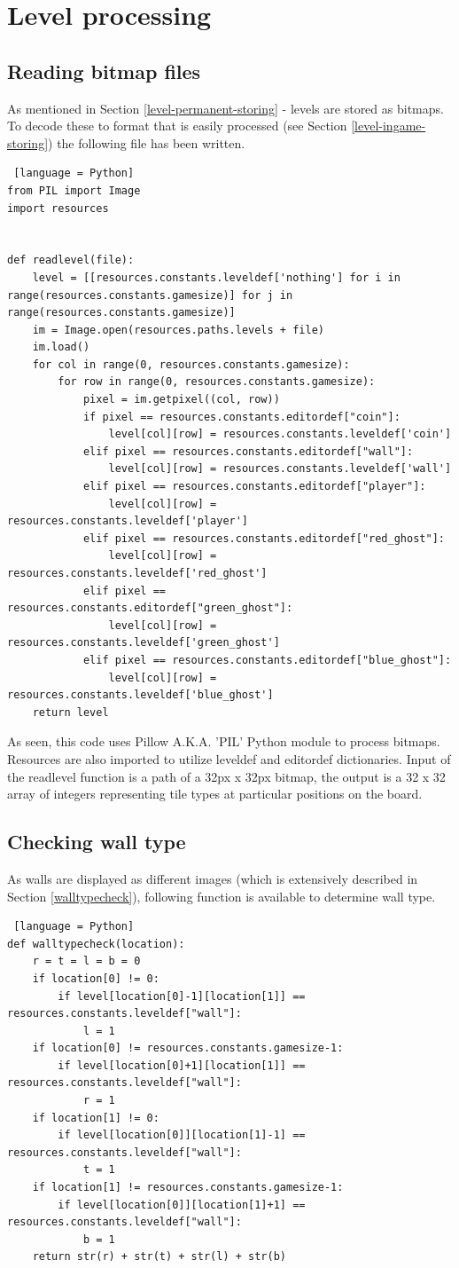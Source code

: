\documentclass[11pt,a4paper,notitlepage]{report}
\newcommand{\dsubsection}[1]{\FloatBarrier \subsection{#1}}
\begin{document}
		\section{Level processing}
			\dsubsection{Reading bitmap files}
				As mentioned in Section \ref{level-permanent-storing} - levels are stored as bitmaps. To decode these to format that is easily processed (see Section \ref{level-ingame-storing}) the following file has been written.
				\begin{lstlisting} [language = Python]
from PIL import Image
import resources


def readlevel(file):
	level = [[resources.constants.leveldef['nothing'] for i in range(resources.constants.gamesize)] for j in range(resources.constants.gamesize)]
	im = Image.open(resources.paths.levels + file)
	im.load()
	for col in range(0, resources.constants.gamesize):
		for row in range(0, resources.constants.gamesize):
			pixel = im.getpixel((col, row))
			if pixel == resources.constants.editordef["coin"]:
				level[col][row] = resources.constants.leveldef['coin']
			elif pixel == resources.constants.editordef["wall"]:
				level[col][row] = resources.constants.leveldef['wall']
			elif pixel == resources.constants.editordef["player"]:
				level[col][row] = resources.constants.leveldef['player']
			elif pixel == resources.constants.editordef["red_ghost"]:
				level[col][row] = resources.constants.leveldef['red_ghost']
			elif pixel == resources.constants.editordef["green_ghost"]:
				level[col][row] = resources.constants.leveldef['green_ghost']
			elif pixel == resources.constants.editordef["blue_ghost"]:
				level[col][row] = resources.constants.leveldef['blue_ghost']
	return level
				\end{lstlisting}
				As seen, this code uses Pillow A.K.A. 'PIL' Python module to process bitmaps. Resources are also imported to utilize leveldef and editordef dictionaries. Input of the readlevel function is a path of a 32px x 32px bitmap, the output is a 32 x 32 array of integers representing tile types at particular positions on the board. 
			\dsubsection{Checking wall type}
				As walls are displayed as different images (which is extensively described in Section \ref{walltypecheck}), following function is available to determine wall type.
				\begin{lstlisting} [language = Python]
def walltypecheck(location):
	r = t = l = b = 0
	if location[0] != 0:
		if level[location[0]-1][location[1]] == resources.constants.leveldef["wall"]:
			l = 1
	if location[0] != resources.constants.gamesize-1:
		if level[location[0]+1][location[1]] == resources.constants.leveldef["wall"]:
			r = 1
	if location[1] != 0:
		if level[location[0]][location[1]-1] == resources.constants.leveldef["wall"]:
			t = 1
	if location[1] != resources.constants.gamesize-1:
		if level[location[0]][location[1]+1] == resources.constants.leveldef["wall"]:
			b = 1
	return str(r) + str(t) + str(l) + str(b)
				\end{lstlisting}
\end{document}
